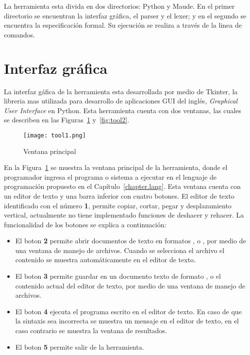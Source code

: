 La herramienta esta divida en dos directorios: Python y Maude. En el primer directorio se encuentran la interfaz gr\'afica, el parser y el lexer; y en el segundo se encuentra la especificaci\'on formal. Su ejecuci\'on se realiza a trav\'es de la linea de comandos.

\section{Interfaz gr\'afica}
\label{gui.envir}

La interfaz g\'afica de la herramienta esta desarrollada por medio de Tkinter, la libreria mas utilizada para desarrollo de aplicaciones GUI {del ingl\'es, \textit{Graphical User Interface}} en Python. Esta herramienta cuenta con dos ventanas, las cuales se describen en las Figuras~\ref{fig:tool1} y~\ref{fig:tool2}.

\begin{figure}[htbp] %
   \centering
   \texttt{[image: tool1.png]}
   \caption{Ventana principal}
   \label{fig:tool1}
\end{figure}

En la Figura~\ref{fig:tool1} se muestra la ventana principal de la herramienta, donde el programador ingresa el programa o sistema a ejecutar en el lenguaje de programaci\'on propuesto en el Cap\'itulo~\ref{chapter.lang}. Esta ventana cuenta con un editor de texto y una barra inferior con cuatro botones. El editor de texto identificado con el n\'umero \textbf{1}, permite copiar, cortar, pegar y desplazamiento vertical, actualmente no tiene implementado funciones de deshacer y rehacer. La funcionalidad de los botones se explica a continuaci\'on:

\begin{itemize}
\item El boton \textbf{2} permite abrir documentos de texto en formatos ,  o , por medio de una ventana de manejo de archivos. Cuando se selecciona el archivo el contenido se muestra autom\'aticamente en el editor de texto.
\item El boton \textbf{3} permite guardar en un documento texto de formato ,  o  el contenido actual del editor de texto, por medio de una ventana de manejo de archivos.
\item El boton \textbf{4} ejecuta el programa escrito en el editor de texto. En caso de que la sintaxis sea incorrecta se muestra un mensaje en el editor de texto, en el caso contrario se muestra la ventana de resultados.
\item El boton \textbf{5} permite salir de la herramienta. 
\end{itemize}

